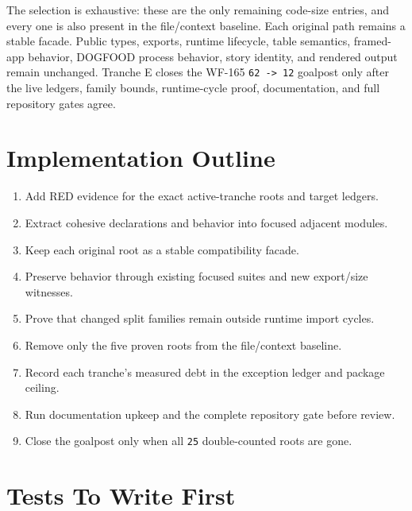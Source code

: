 The selection is exhaustive: these are the only remaining code-size entries, and every one is also present in the file/context baseline. Each original path remains a stable facade. Public types, exports, runtime lifecycle, table semantics, framed-app behavior, DOGFOOD process behavior, story identity, and rendered output remain unchanged. Tranche E closes the WF-165 \texttt{6\allowbreak{}2\allowbreak{} \allowbreak{}-\allowbreak{}>\allowbreak{} \allowbreak{}1\allowbreak{}2} goalpost only after the live ledgers, family bounds, runtime-cycle proof, documentation, and full repository gates agree.

\section{Implementation Outline}\label{record-247-implementation-outline}

\begin{enumerate}
\def\labelenumi{\arabic{enumi}.}
\tightlist
\item
  Add RED evidence for the exact active-tranche roots and target ledgers.
\item
  Extract cohesive declarations and behavior into focused adjacent modules.
\item
  Keep each original root as a stable compatibility facade.
\item
  Preserve behavior through existing focused suites and new export/size witnesses.
\item
  Prove that changed split families remain outside runtime import cycles.
\item
  Remove only the five proven roots from the file/context baseline.
\item
  Record each tranche's measured debt in the exception ledger and package ceiling.
\item
  Run documentation upkeep and the complete repository gate before review.
\item
  Close the goalpost only when all \texttt{2\allowbreak{}5} double-counted roots are gone.
\end{enumerate}

\section{Tests To Write First}\label{record-247-tests-to-write-first}


